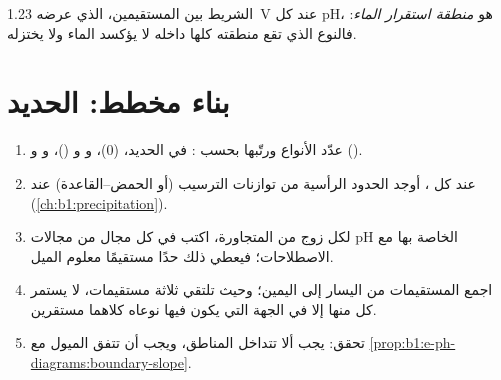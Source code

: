 \begin{definition}\label{def:b1:e-ph-diagrams:water-domain}
الشريط بين المستقيمين، الذي عرضه \qty{1.23}{V} عند كل pH، هو
\emph{منطقة استقرار الماء}: فالنوع
الذي تقع منطقته كلها داخله لا يؤكسد الماء ولا
يختزله.
\end{definition}

\section{بناء مخطط: الحديد}

\begin{method}\label{met:b1:e-ph-diagrams:build}
\begin{enumerate}
  \item عدّد الأنواع ورتّبها بحسب : في الحديد،
         (0)، و و ()، و
        و ().
  \item عند كل ، أوجد الحدود الرأسية من
        توازنات الترسيب (أو الحمض--القاعدة) عند  (\cref{ch:b1:precipitation}).
  \item لكل زوج من  المتجاورة، اكتب
         في كل مجال من مجالات pH  الخاصة بها مع
        الاصطلاحات؛ فيعطي ذلك حدًا مستقيمًا معلوم الميل.
  \item اجمع المستقيمات من اليسار إلى اليمين؛ وحيث تلتقي ثلاثة مستقيمات،
        لا يستمر كل منها إلا في الجهة التي يكون فيها نوعاه كلاهما
        مستقرين.
  \item تحقق: يجب ألا تتداخل المناطق، ويجب أن تتفق الميول
        مع \cref{prop:b1:e-ph-diagrams:boundary-slope}.
\end{enumerate}
\end{method}

